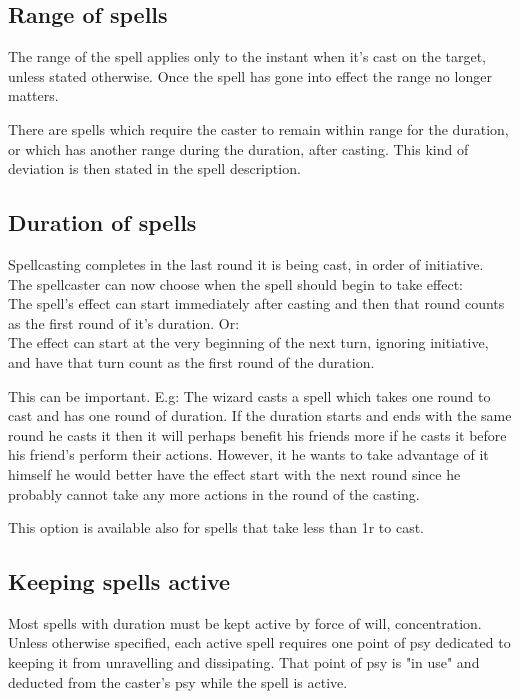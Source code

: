 \subsection*{Range of spells}
The range of the spell applies only to the instant when it's cast on the target, unless stated otherwise. Once the spell has gone into effect the range no longer matters. 

There are spells which require the caster to remain within range for the duration, or which has another range during the duration, after casting. This kind of deviation is then stated in the spell description.


\subsection*{Duration of spells}
Spellcasting completes in the last round it is being cast, in order of initiative. The spellcaster can now choose when the spell should begin to take effect: \\
The spell's effect can start immediately after casting and then that round counts as the first round of it's duration. Or: \\
The effect can start at the very beginning of the next turn, ignoring initiative, and have that turn count as the first round of the duration.

This can be important. E.g: The wizard casts a spell which takes one round to cast and has one round of duration. If the duration starts and ends with the same round he casts it then it will perhaps benefit his friends more if he casts it before his friend's perform their actions. However, it he wants to take advantage of it himself he would better have the effect start with the next round since he probably cannot take any more actions in the round of the casting.

This option is available also for spells that take less than 1r to cast.


\subsection*{Keeping spells active}
Most spells with duration must be kept active by force of will, concentration. Unless otherwise specified, each active spell requires one point of psy dedicated to keeping it from unravelling and dissipating. That point of psy is "in use" and deducted from the caster's psy while the spell is active.

